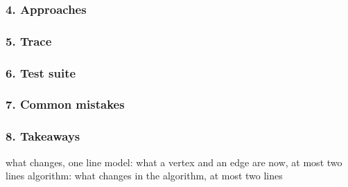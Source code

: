 \subsubsection*{4. Approaches}
\begin{bruteforcebox}
\end{bruteforcebox}
\begin{algorithmbox}
\end{algorithmbox}
\begin{invariantbox}
\end{invariantbox}
\begin{alternativebox}
\end{alternativebox}
\begin{tricksbox}
\end{tricksbox}

\subsubsection*{5. Trace}
\begin{tracebox}[{Sample 1}]
\end{tracebox}

\subsubsection*{6. Test suite}
\begin{testbox}
\end{testbox}

\subsubsection*{7. Common mistakes}

\subsubsection*{8. Takeaways}
\begin{variantsbox}
  {what changes, one line}
  {model: what a vertex and an edge are now, at most two lines}
  {algorithm: what changes in the algorithm, at most two lines}
\end{variantsbox}

